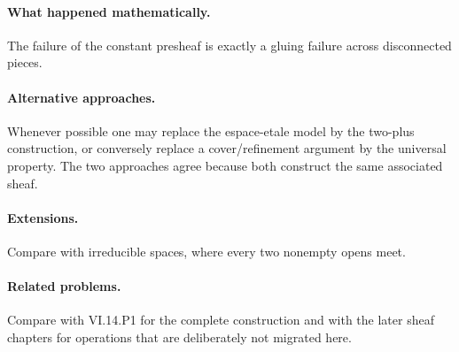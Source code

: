 \paragraph{What happened mathematically.}
The failure of the constant presheaf is exactly a gluing failure across disconnected pieces.

\paragraph{Alternative approaches.}
Whenever possible one may replace the espace-etale model by the two-plus construction, or conversely replace a cover/refinement argument by the universal property.  The two approaches agree because both construct the same associated sheaf.

\paragraph{Extensions.}
Compare with irreducible spaces, where every two nonempty opens meet.

\paragraph{Related problems.}
Compare with VI.14.P1 for the complete construction and with the later sheaf chapters for operations that are deliberately not migrated here.
\fi
